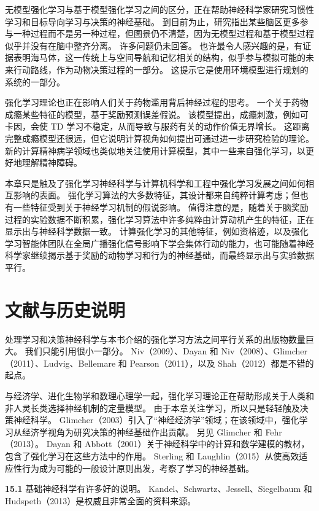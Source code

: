 \documentclass[UTF8, 12pt, fontset=fandol, oneside]{ctexart}
\begin{document}
无模型强化学习与基于模型强化学习之间的区分，正在帮助神经科学家研究习惯性学习和目标导向学习与决策的神经基础。
到目前为止，研究指出某些脑区更多参与一种过程而不是另一种过程，但图景仍不清楚，因为无模型过程和基于模型过程似乎并没有在脑中整齐分离。
许多问题仍未回答。
也许最令人感兴趣的是，有证据表明海马体，这一传统上与空间导航和记忆相关的结构，似乎参与模拟可能的未来行动路线，作为动物决策过程的一部分。
这提示它是使用环境模型进行规划的系统的一部分。

强化学习理论也正在影响人们关于药物滥用背后神经过程的思考。
一个关于药物成瘾某些特征的模型，基于奖励预测误差假说。
该模型提出，成瘾刺激，例如可卡因，会使 TD 学习不稳定，从而导致与服药有关的动作价值无界增长。
这距离完整成瘾模型还很远，但它说明计算视角如何提出可通过进一步研究检验的理论。
新的计算精神病学领域也类似地关注使用计算模型，其中一些来自强化学习，以更好地理解精神障碍。

本章只是触及了强化学习神经科学与计算机科学和工程中强化学习发展之间如何相互影响的表面。
强化学习算法的大多数特征，其设计都来自纯粹计算考虑；但也有一些特征受到关于神经学习机制的假说影响。
值得注意的是，随着关于脑奖励过程的实验数据不断积累，强化学习算法中许多纯粹由计算动机产生的特征，正在显示出与神经科学数据一致。
计算强化学习的其他特征，例如资格迹，以及强化学习智能体团队在全局广播强化信号影响下学会集体行动的能力，也可能随着神经科学家继续揭示基于奖励的动物学习和行为的神经基础，而最终显示出与实验数据平行。

\section*{文献与历史说明}

处理学习和决策神经科学与本书介绍的强化学习方法之间平行关系的出版物数量巨大。
我们只能引用很小一部分。
Niv（2009）、Dayan 和 Niv（2008）、Glimcher（2011）、Ludvig、Bellemare 和 Pearson（2011），以及 Shah（2012）都是不错的起点。

与经济学、进化生物学和数理心理学一起，强化学习理论正在帮助形成关于人类和非人灵长类选择神经机制的定量模型。
由于本章关注学习，所以只是轻轻触及决策神经科学。
Glimcher（2003）引入了“神经经济学”领域；在该领域中，强化学习从经济学视角为研究决策的神经基础作出贡献。
另见 Glimcher 和 Fehr（2013）。
Dayan 和 Abbott（2001）关于神经科学中的计算和数学建模的教材，包含了强化学习在这些方法中的作用。
Sterling 和 Laughlin（2015）从使高效适应性行为成为可能的一般设计原则出发，考察了学习的神经基础。

\noindent\textbf{15.1}
基础神经科学有许多好的说明。
Kandel、Schwartz、Jessell、Siegelbaum 和 Hudspeth（2013）是权威且非常全面的资料来源。
\end{document}
